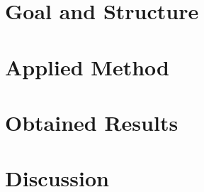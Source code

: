 \documentclass[sigconf, nonacm]{acmart}
\begin{document}
\section{Goal and Structure}
\label{goal_and_structure}


\section{Applied Method}
\label{applied_methods}



\section{Obtained Results}
\label{obtained_results}



\section{Discussion}
\label{discussion}




\end{document}
